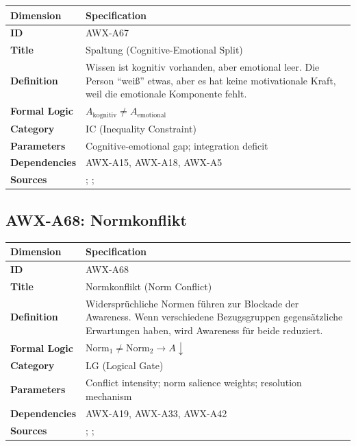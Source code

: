 \begin{table}[htbp]
\small
\begin{tabular}{p{3cm}p{11cm}}
\toprule
\textbf{Dimension} & \textbf{Specification} \\
\midrule
\textbf{ID} & AWX-A67 \\
\textbf{Title} & Spaltung (Cognitive-Emotional Split) \\
\textbf{Definition} & Wissen ist kognitiv vorhanden, aber emotional leer. Die Person ``weiß'' etwas, aber es hat keine motivationale Kraft, weil die emotionale Komponente fehlt. \\
\textbf{Formal Logic} & $A_{\text{kognitiv}} \neq A_{\text{emotional}}$ \\
\textbf{Category} & IC (Inequality Constraint) \\
\textbf{Parameters} & Cognitive-emotional gap; integration deficit \\
\textbf{Dependencies} & AWX-A15, AWX-A18, AWX-A5 \\
\textbf{Sources} & \citet{damasio1994descartes}; \citet{loewenstein2001risk}; \citet{slovic2004risk} \\
\bottomrule
\end{tabular}
\end{table}


\subsection{AWX-A68: Normkonflikt}

\begin{table}[htbp]
\small
\begin{tabular}{p{3cm}p{11cm}}
\toprule
\textbf{Dimension} & \textbf{Specification} \\
\midrule
\textbf{ID} & AWX-A68 \\
\textbf{Title} & Normkonflikt (Norm Conflict) \\
\textbf{Definition} & Widersprüchliche Normen führen zur Blockade der Awareness. Wenn verschiedene Bezugsgruppen gegensätzliche Erwartungen haben, wird Awareness für beide reduziert. \\
\textbf{Formal Logic} & $\text{Norm}_1 \neq \text{Norm}_2 \rightarrow A \downarrow$ \\
\textbf{Category} & LG (Logical Gate) \\
\textbf{Parameters} & Conflict intensity; norm salience weights; resolution mechanism \\
\textbf{Dependencies} & AWX-A19, AWX-A33, AWX-A42 \\
\textbf{Sources} & \citet{cialdini2004social}; \citet{bicchieri2005grammar}; \citet{PAP-akerlof2000identity} \\
\bottomrule
\end{tabular}
\end{table}

